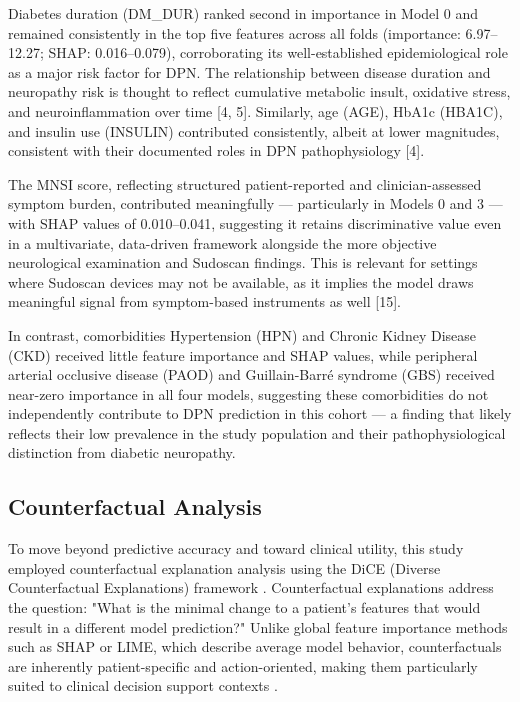 \documentclass[pdflatex,sn-vancouver-num]{sn-jnl}
\begin{document}
Diabetes duration (DM\_DUR) ranked second in importance in Model 0 and remained consistently in the top five features across all folds (importance: 6.97–12.27; SHAP: 0.016–0.079), corroborating its well-established epidemiological role as a major risk factor for DPN. The relationship between disease duration and neuropathy risk is thought to reflect cumulative metabolic insult, oxidative stress, and neuroinflammation over time [4, 5]. Similarly, age (AGE), HbA1c (HBA1C), and insulin use (INSULIN) contributed consistently, albeit at lower magnitudes, consistent with their documented roles in DPN pathophysiology [4].

The MNSI score, reflecting structured patient-reported and clinician-assessed symptom burden, contributed meaningfully — particularly in Models 0 and 3 — with SHAP values of 0.010–0.041, suggesting it retains discriminative value even in a multivariate, data-driven framework alongside the more objective neurological examination and Sudoscan findings. This is relevant for settings where Sudoscan devices may not be available, as it implies the model draws meaningful signal from symptom-based instruments as well [15].

In contrast, comorbidities Hypertension (HPN) and Chronic Kidney Disease (CKD) received little feature importance and SHAP values, while peripheral arterial occlusive disease (PAOD) and Guillain-Barré syndrome (GBS) received near-zero importance in all four models, suggesting these comorbidities do not independently contribute to DPN prediction in this cohort — a finding that likely reflects their low prevalence in the study population and their pathophysiological distinction from diabetic neuropathy.

\subsection{Counterfactual Analysis}
To move beyond predictive accuracy and toward clinical utility, this study employed counterfactual explanation analysis using the DiCE (Diverse Counterfactual Explanations) framework \cite{mothilal2020}. Counterfactual explanations address the question: "What is the minimal change to a patient's features that would result in a different model prediction?" Unlike global feature importance methods such as SHAP or LIME, which describe average model behavior, counterfactuals are inherently patient-specific and action-oriented, making them particularly suited to clinical decision support contexts \cite{wachter2017}.
\end{document}
